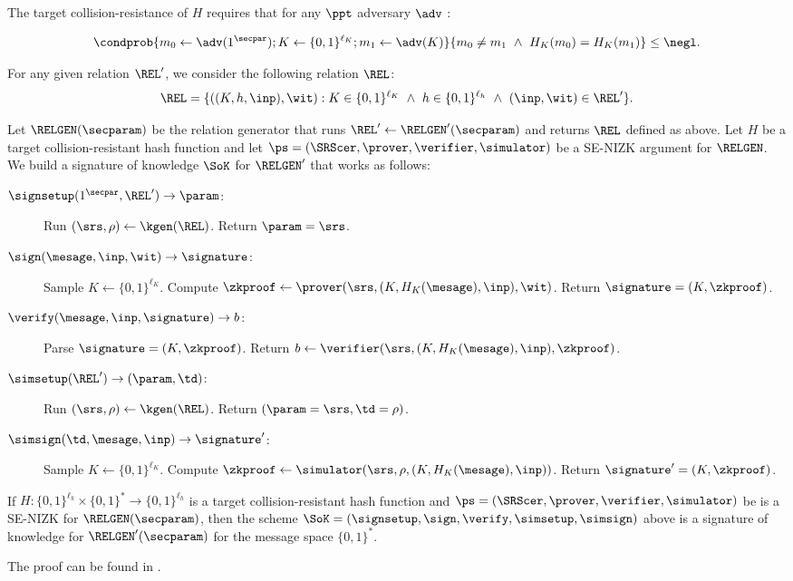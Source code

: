 The target collision-resistance of $H$ requires that for any $\ppt$ adversary $\adv$ : 
 
	\[  \condprob{
	m_0 \gets \adv(1^\secpar); K \gets \{0, 1\}^{\ell_K}; m_1 \gets \adv(K)
}{
	m_0 \neq m_1 ~\land  ~H_K(m_0)=H_K(m_1)
} \leq \negl.
	\]
	
For any given relation $\REL'$, we consider the  following relation $\REL$:
 	\[\REL= \{((K,h,\inp),\wit) : K\in  \{0, 1\}^{\ell_K} ~\land ~h \in  \{0, 1\}^{\ell_h} ~\land ~(\inp, \wit) \in \REL'\}.
 	\]
 	
Let $\RELGEN(\secparam)$ be the relation generator that runs $\REL' \gets \RELGEN'(\secparam)$ and returns $\REL$ defined as above. 
Let $H$ be a target collision-resistant hash function and let $\ps = (\SRScer, \prover, \verifier, \simulator)$ be a SE-NIZK argument for $\RELGEN$. 
We build a signature of knowledge  $\SoK$ for $\RELGEN'$ that works as follows: 

\begin{description}
    \item[$\signsetup(1^\secpar, \REL') \rightarrow  \param$:]
 Run $(\srs,\rho) \leftarrow \kgen(\REL)$. 
 Return $ \param = \srs$.

    \item[$\sign(\mesage, \inp, \wit)  \rightarrow \signature$:]
Sample $K \gets \{0, 1\}^{\ell_K}$.  Compute
$\zkproof \gets  \prover(\srs, (K, H_K(\mesage), \inp), \wit) $.
Return $\signature = (K, \zkproof)$.

    \item[$\verify(\mesage, \inp, \signature) \rightarrow b$:]
Parse $\signature = (K, \zkproof)$.
Return $b \gets \verifier(\srs, (K, H_K(\mesage), \inp), \zkproof)$.
	
    \item[$\simsetup(\REL') \rightarrow (\param, \td)$:]
  Run   $(\srs,\rho) \leftarrow \kgen(\REL)$. 
 Return $( \param = \srs,  \td = \rho)$.

    	
   \item[$\simsign(\td, \mesage, \inp) \rightarrow \signature'$:]
   Sample $K \gets \{0, 1\}^{\ell_K}$.  Compute
$\zkproof \gets \simulator(\srs, \rho, (K, H_K(\mesage), \inp)) $.
Return $\signature' = (K, \zkproof)$.

\end{description} 


\begin{theorem} 
  \label{thm:SoK}
If $H:\{0, 1\}^{\ell_k} \times \{0, 1\}^* \to \{0, 1\}^{\ell_h}$ is a target collision-resistant hash function 
and $\ps = (\SRScer, \prover, \verifier, \simulator)$ be is a SE-NIZK for $\RELGEN(\secparam)$, then the scheme
 $\SoK = (\signsetup,  \sign, \allowbreak \verify,  \simsetup, \simsign)$ above is a signature of knowledge for $\RELGEN'(\secparam)$ for  the message space $\{0, 1\}^*$.
\end{theorem}
 The proof can be found in 
 \cite{C:GroMal17}.
	

